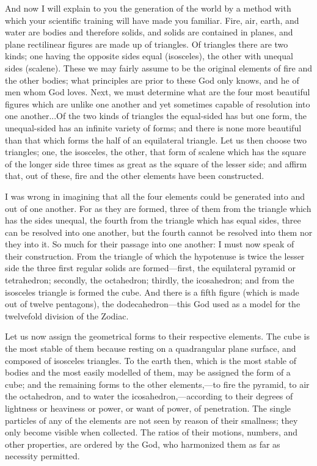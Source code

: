\documentclass[11pt,letter]{article}
\begin{document}
\par  And now I will explain to you the generation of the world by a method with which your scientific training will have made you familiar. Fire, air, earth, and water are bodies and therefore solids, and solids are contained in planes, and plane rectilinear figures are made up of triangles. Of triangles there are two kinds; one having the opposite sides equal (isosceles), the other with unequal sides (scalene). These we may fairly assume to be the original elements of fire and the other bodies; what principles are prior to these God only knows, and he of men whom God loves. Next, we must determine what are the four most beautiful figures which are unlike one another and yet sometimes capable of resolution into one another...Of the two kinds of triangles the equal-sided has but one form, the unequal-sided has an infinite variety of forms; and there is none more beautiful than that which forms the half of an equilateral triangle. Let us then choose two triangles; one, the isosceles, the other, that form of scalene which has the square of the longer side three times as great as the square of the lesser side; and affirm that, out of these, fire and the other elements have been constructed.

\par  I was wrong in imagining that all the four elements could be generated into and out of one another. For as they are formed, three of them from the triangle which has the sides unequal, the fourth from the triangle which has equal sides, three can be resolved into one another, but the fourth cannot be resolved into them nor they into it. So much for their passage into one another: I must now speak of their construction. From the triangle of which the hypotenuse is twice the lesser side the three first regular solids are formed—first, the equilateral pyramid or tetrahedron; secondly, the octahedron; thirdly, the icosahedron; and from the isosceles triangle is formed the cube. And there is a fifth figure (which is made out of twelve pentagons), the dodecahedron—this God used as a model for the twelvefold division of the Zodiac.

\par  Let us now assign the geometrical forms to their respective elements. The cube is the most stable of them because resting on a quadrangular plane surface, and composed of isosceles triangles. To the earth then, which is the most stable of bodies and the most easily modelled of them, may be assigned the form of a cube; and the remaining forms to the other elements,—to fire the pyramid, to air the octahedron, and to water the icosahedron,—according to their degrees of lightness or heaviness or power, or want of power, of penetration. The single particles of any of the elements are not seen by reason of their smallness; they only become visible when collected. The ratios of their motions, numbers, and other properties, are ordered by the God, who harmonized them as far as necessity permitted.
\end{document}
